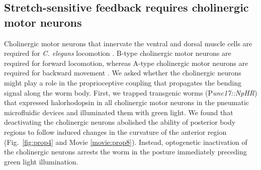 \subsection{Stretch-sensitive feedback requires cholinergic motor neurons }
 
Cholinergic motor neurons that innervate the ventral and dorsal muscle cells are required for \textit{C. elegans} locomotion \citep{chalfie_neural_1985,leifer_optogenetic_2011}. B-type cholinergic motor neurons are required for forward 
locomotion, whereas A-type cholinergic motor neurons are required for backward movement 
\citep{chalfie_neural_1985}. We asked whether the cholinergic neurons might play a role in the proprioceptive coupling  that propagates the bending signal along the worm body. First, we trapped transgenic worms 
(P\textit{unc17::NpHR}) that expressed halorhodopsin in all cholinergic motor neurons in the pneumatic 
microfluidic devices and illuminated them with green light. We found that deactivating the 
cholinergic neurons abolished the ability of posterior body regions to follow induced changes in 
the curvature of the anterior region (Fig.~\ref{fig:prop4} and Movie  \ref{movie:prop8}). Instead, optogenetic 
inactivation of the cholinergic neurons arrests the worm in the posture immediately preceding 
green light illumination.  


